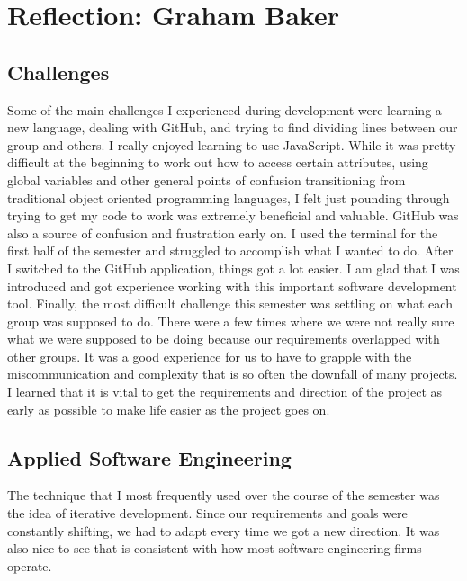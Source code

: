 \documentclass[a4paper]{article}
\begin{document}
\section{Reflection: Graham Baker}
\subsection{Challenges}
Some of the main challenges I experienced during development were learning a new language, dealing with GitHub, and trying to find dividing lines between our group and others. I really enjoyed learning to use JavaScript. While it was pretty difficult at the beginning to work out how to access certain attributes, using global variables and other general points of confusion transitioning from traditional object oriented programming languages, I felt just pounding through trying to get my code to work was extremely beneficial and valuable. GitHub was also a source of confusion and frustration early on. I used the terminal for the first half of the semester and struggled to accomplish what I wanted to do. After I switched to the GitHub application, things got a lot easier. I am glad that I was introduced and got experience working with this important software development tool. Finally, the most difficult challenge this semester was settling on what each group was supposed to do. There were a few times where we were not really sure what we were supposed to be doing because our requirements overlapped with other groups. It was a good experience for us to have to grapple with the miscommunication and complexity that is so often the downfall of many projects. I learned that it is vital to get the requirements and direction of the project as early as possible to make life easier as the project goes on. 


\subsection{Applied Software Engineering}
The technique that I most frequently used over the course of the semester was the idea of iterative development. Since our requirements and goals were constantly shifting, we had to adapt every time we got a new direction. It was also nice to see that is consistent with how most software engineering firms operate.   
\end{document}
